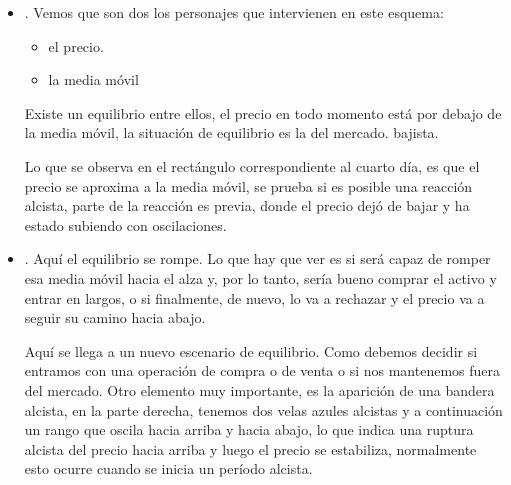 \begin{itemize}
    \item {}. Vemos que son dos los personajes que intervienen en este esquema:
    \begin{itemize}
        \item el precio.
        \item la media móvil
    \end{itemize}
    Existe un equilibrio entre ellos, el precio en todo momento está por debajo de la media móvil, la situación de equilibrio es la del mercado. bajista.

    Lo que se observa en el rectángulo correspondiente al cuarto día, es que el precio se aproxima a la media móvil, se prueba si es posible una reacción alcista, parte de la reacción es previa, donde el precio dejó de bajar y ha estado subiendo con oscilaciones.
    \item {}. Aquí el equilibrio se rompe.  Lo que hay que ver es si será capaz de romper esa media móvil hacia el alza y, por lo tanto, sería bueno comprar el activo y entrar en largos, o si finalmente, de nuevo, lo va a rechazar y el precio va a seguir su camino hacia abajo.
    
    Aquí se llega a un nuevo escenario de equilibrio. Como  debemos decidir si entramos con una operación de compra o de venta o si nos mantenemos fuera del mercado. Otro elemento muy importante, es la aparición de una bandera alcista, en la parte derecha, tenemos dos velas azules alcistas y a continuación un rango que oscila hacia arriba y hacia abajo, lo que indica una ruptura alcista del precio hacia arriba y luego el precio se estabiliza, normalmente esto ocurre cuando se inicia un período alcista.
    

\end{itemize}
